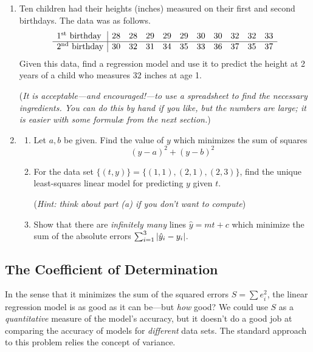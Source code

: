 \begin{exercises}{}{}
\begin{enumerate}
	  
	  \item\label{exs:kidsheights} Ten children had their heights (inches) measured on their first and second birthdays. The data was as follows.
	  \[
	  	\begin{array}{l|cccccccccc}
	  		\text{1\textsuperscript{st}{} birthday}&28&28&29&29&29&30&30&32&32&33\\\hline
	  		\text{2\textsuperscript{nd}{} birthday}&30&32&31&34&35&33&36&37&35&37
	  	\end{array}
	  \]
	  Given this data, find a regression model and use it to predict the height at 2 years of a child who measures 32 inches at age 1.
	  \par
	  (\emph{It is acceptable---and encouraged!---to use a spreadsheet to find the necessary ingredients. You can do this by hand if you like, but the numbers are large; it is easier with some formulæ from the next section.})
	  
	  \item\begin{enumerate}
	    \item Let $a,b$ be given. Find the value of $y$ which minimizes the sum of squares
	    \[
	    	(y-a)^2+(y-b)^2
	    \]
	    \item For the data set $\bigl\{(t,y)\bigr\} =\bigl\{(1,1),(2,1),(2,3)\bigr\}$, find the unique least-squares linear model for predicting $y$ given $t$.\par
	    (\emph{Hint: think about part (a) if you don't want to compute})
	    \item	Show that there are \emph{infinitely many} lines $\hat y=mt+c$ which minimize the sum of the absolute errors $\sum_{i=1}^3\left| \hat y_i-y_i\right|$.
	  \end{enumerate}
	\end{enumerate}
\end{exercises}




\clearpage



\subsection{The Coefficient of Determination}

In the sense that it minimizes the sum of the squared errors $S=\sum e_i^2$, the linear regression model is as good as it can be---but \emph{how} good? We could use $S$ as a \emph{quantitative} measure of the model's accuracy, but it doesn't do a good job at comparing the accuracy of models for \emph{different} data sets. The standard approach to this problem relies the concept of variance.


